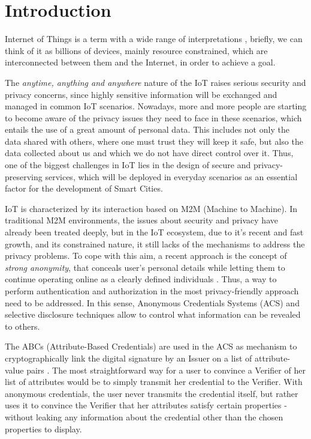 \section{Introduction}

Internet of Things is a term with a wide range of interpretations \cite{Atzori20102787}, briefly, we can think of it as billions of devices, mainly resource constrained, which are interconnected between them and the Internet, in order to achieve a goal.

The \textit{anytime, anything and anywhere} nature of the IoT raises serious security and privacy concerns, since highly sensitive information will be exchanged and managed in common IoT scenarios.  Nowadays, more and more people are starting to become aware of the privacy issues they need to face in these scenarios, which entails the use of a great amount of personal data. This includes not only the data shared with others, where one must trust they will keep it safe, but also the data collected about us and which we do not have direct control over it. Thus, one of the biggest challenges in IoT lies in the design of secure and privacy-preserving services, which will be deployed in everyday scenarios as an essential factor for the development of Smart Cities.

IoT is characterized by its interaction based on M2M (Machine to Machine). In traditional M2M environments, the issues about security and privacy have already been treated deeply, but in the IoT ecosystem, due to it's recent and fast growth, and its constrained nature, it still lacks of the mechanisms to address the privacy problems. To cope with this aim, a recent approach is the concept of \textit{strong anonymity}, that conceals user's personal details while letting them to continue operating online as a clearly defined individuals \cite{stronganonymity}. Thus, a way to perform authentication and authorization in the most privacy-friendly approach need to be addressed. In this sense, Anonymous Credentials Systems (ACS) \cite{camenisch2001efficient} and selective disclosure techniques allow to control what information can be revealed to others.

The ABCs (Attribute-Based Credentials) are used in the ACS as mechanism to cryptographically link the digital signature by an Issuer on a list of attribute-value pairs \cite{introCredIBM}. The most straightforward way for a user to convince a Verifier of her list of attributes would be to simply transmit her credential to the Verifier. With anonymous credentials, the user never transmits the credential itself, but rather uses it to convince the Verifier that her attributes satisfy certain properties - without leaking any information about the credential other than the chosen properties to display. 

